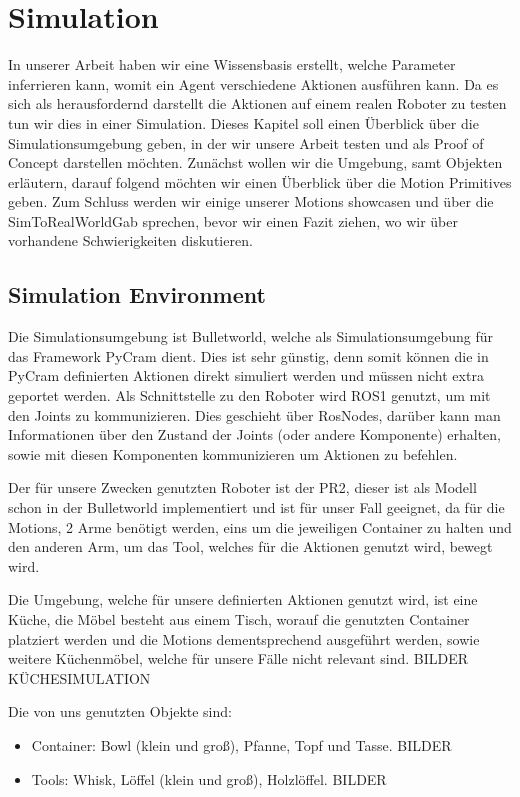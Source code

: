 \chapter*{Simulation}
In unserer Arbeit haben wir eine Wissensbasis erstellt, welche Parameter inferrieren kann, womit ein Agent verschiedene Aktionen ausführen kann. Da es sich als herausfordernd darstellt die Aktionen auf einem realen Roboter zu testen tun wir dies in einer Simulation.
Dieses Kapitel soll einen Überblick über die Simulationsumgebung geben, in der wir unsere Arbeit testen und als Proof of Concept darstellen möchten.
Zunächst wollen wir die Umgebung, samt Objekten erläutern, darauf folgend möchten wir einen Überblick über die Motion Primitives geben.
Zum Schluss werden wir einige unserer Motions showcasen und über die SimToRealWorldGab sprechen, bevor wir einen Fazit ziehen, wo wir über vorhandene Schwierigkeiten diskutieren.

\section*{Simulation Environment}

Die Simulationsumgebung ist Bulletworld, welche als Simulationsumgebung für das Framework PyCram dient. Dies ist sehr günstig, denn somit können die in PyCram definierten Aktionen direkt simuliert werden und müssen nicht extra geportet werden. Als Schnittstelle zu den Roboter wird ROS1 genutzt, um mit den Joints zu kommunizieren. Dies geschieht über RosNodes, darüber kann man Informationen über den Zustand der Joints (oder andere Komponente) erhalten, sowie mit diesen Komponenten kommunizieren um Aktionen zu befehlen.

Der für unsere Zwecken genutzten Roboter ist der PR2, dieser ist als Modell schon in der Bulletworld implementiert und ist für unser Fall geeignet, da für die Motions, 2 Arme benötigt werden, eins um die jeweiligen Container zu halten und den anderen Arm, um das Tool, welches für die Aktionen genutzt wird, bewegt wird.

Die Umgebung, welche für unsere definierten Aktionen genutzt wird, ist eine Küche, die Möbel besteht aus einem Tisch, worauf die genutzten Container platziert werden und die Motions dementsprechend ausgeführt werden, sowie weitere Küchenmöbel, welche für unsere Fälle nicht relevant sind.
BILDER KÜCHESIMULATION

Die von uns genutzten Objekte sind:
\begin{itemize}
	\item Container: Bowl (klein und groß), Pfanne, Topf und Tasse. BILDER
	\item Tools: Whisk, Löffel (klein und groß), Holzlöffel. BILDER
\end{itemize}

